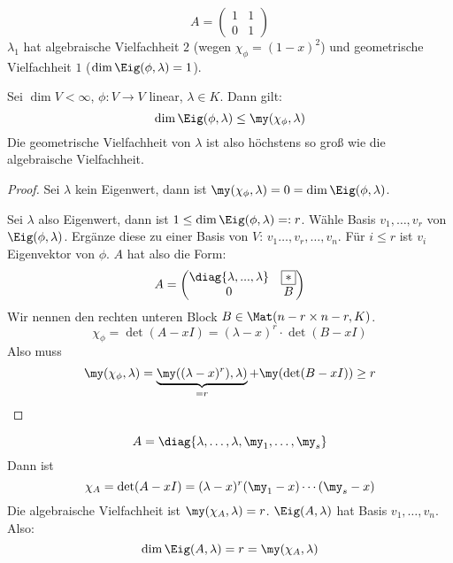 \documentclass[a4paper, 10pt]{scrbook}
\begin{document}
\begin{ex}
\[
A=\begin{pmatrix}1&1\\0&1\end{pmatrix}
\]
$\lambda_1$ hat algebraische Vielfachheit $2$ (wegen $\chi_\phi=(1-x)^2$) und geometrische Vielfachheit $1$ ($\dim \Eig(\phi,\lambda)=1$).
\end{ex}

\begin{lem}
\label{11.2}
Sei $\dim V<\infty$, $\phi: V\to V$ linear, $\lambda\in K$.
Dann gilt:
\[
\dim \Eig(\phi,\lambda) \le \my(\chi_\phi,\lambda)
\]
Die geometrische Vielfachheit von $\lambda$ ist also höchstens so groß wie die algebraische Vielfachheit.
\begin{proof}
Sei $\lambda$ kein Eigenwert, dann ist $\my(\chi_\phi, \lambda)=0=\dim \Eig(\phi,\lambda)$.

Sei $\lambda$ also Eigenwert, dann ist $1\le \dim \Eig(\phi,\lambda) =: r$.
Wähle Basis $v_1,\dotsc, v_r$ von $\Eig(\phi,\lambda)$.
Ergänze diese zu einer Basis von $V$: $v_1\dotsc, v_r,\dotsc, v_n$.
Für $i\le r$ ist $v_i$ Eigenvektor von $\phi$.
$A$ hat also die Form:
\[
A=\begin{pmatrix}
\diag\{\lambda, ..., \lambda\} & \fbox{$*$} \\
0 & B
\end{pmatrix}
\]
Wir nennen den rechten unteren Block $B\in \Mat(n-r\times n-r, K)$.
\[
\chi_\phi = \det(A-xI) = (\lambda-x)^r\cdot \det(B-xI)
\]
Also muss
\[
\my(\chi_\phi,\lambda) = \underbrace{\my((\lambda-x)^r),\lambda)}_{=r} + \my(\det(B-xI)) \ge r
\]
\end{proof}
\end{lem}


\begin{ex}
\[
	A=\diag\{\lambda,\dotsc,\lambda,\my_1,\dotsc, \my_s\}
\]
Dann ist
\[
\chi_A = \det(A-xI) = (\lambda -x)^r(\my_1-x)\dotsb(\my_s-x)
\]
Die algebraische Vielfachheit ist $\my(\chi_A, \lambda)=r$.
$\Eig(A, \lambda)$ hat Basis $v_1, \dotsc, v_n$.
Also:
\[
\dim \Eig(A,\lambda) = r = \my(\chi_A,\lambda)
\]
\end{ex}
\end{document}
